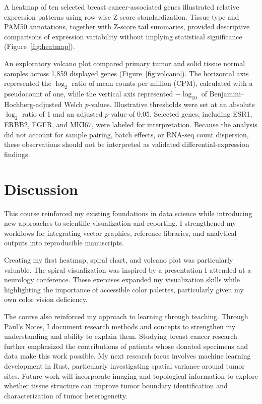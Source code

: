 \documentclass[12pt,letterpaper]{article}
\begin{document}
A heatmap of ten selected breast cancer-associated genes illustrated relative expression patterns using row-wise Z-score standardization. Tissue-type and PAM50 annotations, together with Z-score tail summaries, provided descriptive comparisons of expression variability without implying statistical significance (Figure~\ref{fig:heatmap}).

An exploratory volcano plot compared primary tumor and solid tissue normal samples across 1,859 displayed genes (Figure~\ref{fig:volcano}). The horizontal axis represented the $\log_2$ ratio of mean counts per million (CPM), calculated with a pseudocount of one, while the vertical axis represented $-\log_{10}$ of Benjamini--Hochberg-adjusted Welch $p$-values. Illustrative thresholds were set at an absolute $\log_2$ ratio of 1 and an adjusted $p$-value of 0.05. Selected genes, including ESR1, ERBB2, EGFR, and MKI67, were labeled for interpretation. Because the analysis did not account for sample pairing, batch effects, or RNA-seq count dispersion, these observations should not be interpreted as validated differential-expression findings.



\section*{Discussion}

This course reinforced my existing foundations in data science while introducing new approaches to scientific visualization and reporting. I strengthened my workflows for integrating vector graphics, reference libraries, and analytical outputs into reproducible manuscripts. 

Creating my first heatmap, spiral chart, and volcano plot was particularly valuable. The spiral visualization was inspired by a presentation I attended at a neurology conference. These exercises expanded my visualization skills while highlighting the importance of accessible color palettes, particularly given my own color vision deficiency.

The course also reinforced my approach to learning through teaching. Through Paul's Notes, I document research methods and concepts to strengthen my understanding and ability to explain them. Studying breast cancer research further emphasized the contributions of patients whose donated specimens and data make this work possible.
My next research focus involves machine learning development in Rust, particularly investigating spatial variance around tumor sites. Future work will incorporate imaging and topological information to explore whether tissue structure can improve tumor boundary identification and characterization of tumor heterogeneity.
\end{document}
